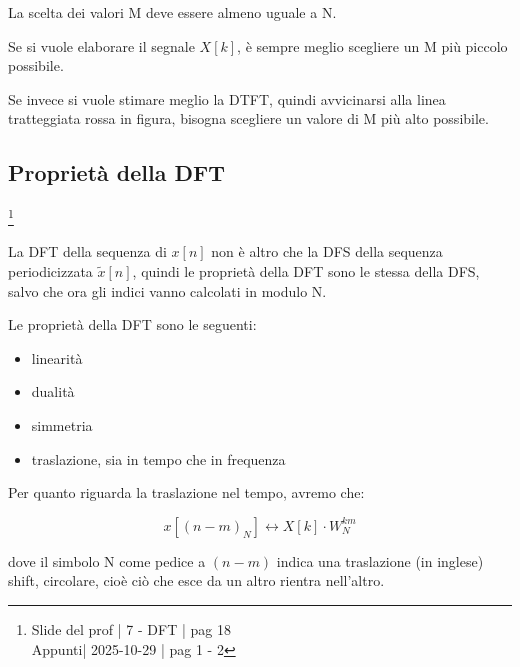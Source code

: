 \begin{tcolorbox}
    La scelta dei valori M deve essere almeno uguale a N. \newline 

    Se si vuole elaborare il segnale $X \left[ k\right]$, è sempre meglio scegliere un M più piccolo possibile. \newline 

    Se invece si vuole stimare meglio la DTFT, quindi avvicinarsi alla linea tratteggiata rossa in figura, bisogna scegliere un valore di M più alto possibile. 
\end{tcolorbox}

\newpage 

\subsection{Proprietà della DFT}

\footnote{ 
    Slide del prof | 7 - DFT | pag 18\\
    Appunti| 2025-10-29 | pag 1 - 2
}

La DFT della sequenza di $x \left[ n\right]$ non è altro che la DFS della sequenza periodicizzata $\tilde{x} \left[ n\right]$, 
quindi le proprietà della DFT sono le stessa della DFS, salvo che ora gli indici vanno calcolati in modulo N. \newline 

Le proprietà della DFT sono le seguenti: 

\begin{itemize}
    \item linearità 
    \item dualità 
    \item simmetria 
    \item traslazione, sia in tempo che in frequenza
\end{itemize}

Per quanto riguarda la traslazione nel tempo, avremo che: 

{
    \Large 
    \begin{equation}
        x \left[ \left(n - m\right)_{N}\right]
        \leftrightarrow 
        X \left[ k\right] \cdot W_N^{km}
    \end{equation}
}

dove il simbolo N come pedice a $\left( n - m\right)$ indica una traslazione (in inglese) shift, circolare, 
cioè ciò che esce da un altro rientra nell'altro. \newline 

